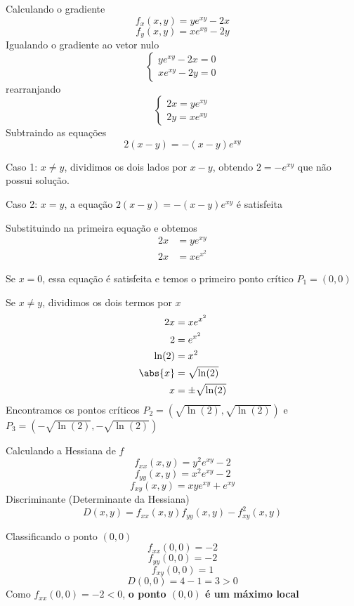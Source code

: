 \documentclass[a4paper,12pt,fleqn]{article}
\begin{document}
\begin{answer}
  Calculando o gradiente
  \[
    f_x(x, y)
    = y e^{xy} - 2x
  \]
  \[
    f_y(x, y)
    = x e^{xy} - 2y
  \]
  Igualando o gradiente ao vetor nulo
  \[
    \begin{cases}
      y e^{xy} - 2x = 0\\
      x e^{xy} - 2y = 0
    \end{cases}
  \]
  rearranjando
  \[
    \begin{cases}
      2x = y e^{xy} \\
      2y = x e^{xy}
    \end{cases}
  \]
  Subtraindo as equações
  \[
    2(x-y) = -(x-y)e^{xy}
  \]

  Caso 1: $x\neq y$, dividimos os dois lados por $x-y$, obtendo
  \(
    2 = -e^{xy}
  \)
  que não possui solução.

  Caso 2: $x=y$, a equação \(2(x-y) = -(x-y)e^{xy}\) é satisfeita

  Substituindo na primeira equação e obtemos
  \begin{align*}
    2x & = y e^{xy} \\
    2x & = x e^{x^2}
  \end{align*}

  Se $x=0$, essa equação é satisfeita e temos o primeiro ponto crítico \(P_1=(0, 0)\)

  Se $x\neq y$, dividimos os dois termos por $x$
  \begin{align*}
    2x      & = x e^{x^2}        \\
    2       & = e^{x^2}          \\
    \ln(2)  & = x^2              \\
    \abs{x} & = \sqrt{\ln(2)}    \\
    x       & = \pm\sqrt{\ln(2)}
  \end{align*}
  Encontramos os pontos críticos
  \(P_2 = \left( \sqrt{\ln(2)},  \sqrt{\ln(2)}\right)\) e
  \(P_3 = \left(-\sqrt{\ln(2)}, -\sqrt{\ln(2)}\right)\)

  \bigskip
  Calculando a Hessiana de $f$
  \[
    f_{xx}(x, y)
    = y^2 e^{xy}-2
  \]
  \[
    f_{yy}(x, y)
    = x^2 e^{xy}-2
  \]
  \[
    f_{xy}(x, y)
    = xy e^{xy}+e^{xy}
  \]
  Discriminante (Determinante da Hessiana)
  \[
    D(x, y) = f_{xx}(x, y)f_{yy}(x, y) - f^2_{xy}(x, y)
  \]

  \bigskip
  Classificando o ponto \((0, 0)\)
  \[
    f_{xx}(0, 0) = -2
  \]
  \[
    f_{yy}(0, 0) = -2
  \]
  \[
    f_{xy}(0, 0) =  1
  \]
  \[
    D(0, 0) = 4-1 = 3 > 0
  \]
  Como \(f_{xx}(0, 0) = -2 < 0\), \textbf{o ponto \((0,0)\) é um máximo local}


\end{answer}
\end{document}
